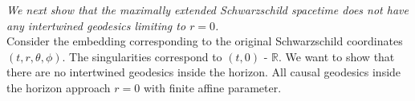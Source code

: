 \documentclass[pdflatex,sn-mathphys-num]{sn-jnl}
\theoremstyle{definition}
\begin{document}
{\it We next show that the maximally extended Schwarzschild spacetime does not have any intertwined geodesics limiting to $r=0$.}\\


Consider the embedding corresponding to the original Schwarzschild coordinates $(t,r,\theta,\phi)$. The singularities correspond to $(t,0)$ - $\mathbb{R}$. We want to show that there are no intertwined geodesics inside the horizon. All causal geodesics inside the horizon approach $r=0$ with finite affine parameter.
\end{document}
